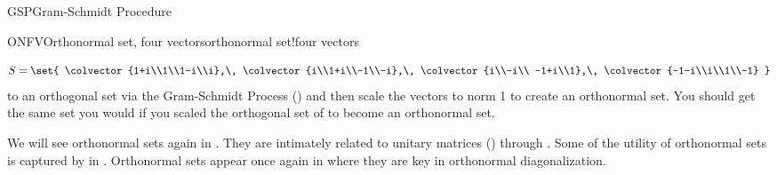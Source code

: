 \begin{subsect}{GSP}{Gram-Schmidt Procedure}
\begin{example}{ONFV}{Orthonormal set, four vectors}{orthonormal set!four vectors}
\begin{para}
\begin{equation*}
S=\set{
\colvector{1+i\\1\\1-i\\i},\,
\colvector{i\\1+i\\-1\\-i},\,
\colvector{i\\-i\\ -1+i\\1},\,
\colvector{-1-i\\i\\1\\-1}
}
\end{equation*}
%
to an orthogonal set via the Gram-Schmidt Process () and then scale the vectors to norm 1 to create an orthonormal set.  You should get the same set you would if you scaled the orthogonal set of  to become an orthonormal set.\end{para}
\end{example}
%
\begin{para}We will see orthonormal sets again in .   They are intimately related to unitary matrices () through .  Some of the utility of orthonormal sets is captured by  in .   Orthonormal sets appear once again in  where they are key in orthonormal diagonalization.\end{para}
%
%
\end{subsect}
%
%

